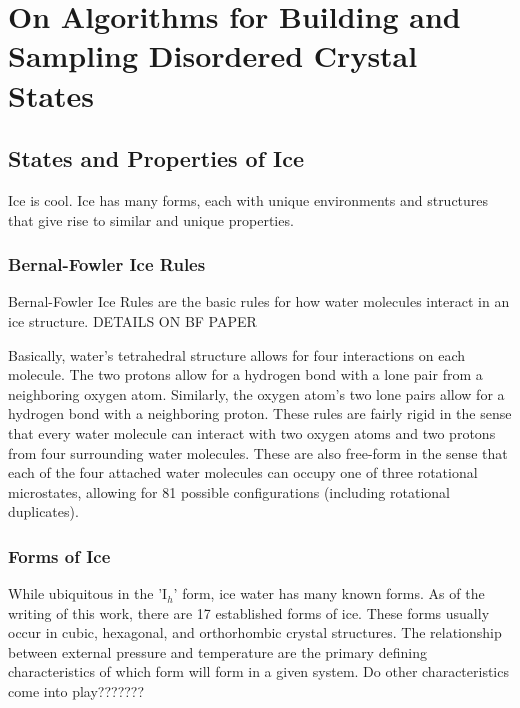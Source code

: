 \chapter{On Algorithms for Building and Sampling Disordered Crystal States}
\label{ch:iceXI}


\section{States and Properties of Ice}

Ice is cool. 
Ice has many forms, each with unique environments and structures that give rise to similar and unique properties. 

\subsection{Bernal-Fowler Ice Rules}

Bernal-Fowler Ice Rules are the basic rules for how water molecules interact in an ice structure.
DETAILS ON BF PAPER

Basically, water's tetrahedral structure allows for four interactions on each molecule. 
The two protons allow for a hydrogen bond with a lone pair from a neighboring oxygen atom.
Similarly, the oxygen atom's two lone pairs allow for a hydrogen bond with a neighboring proton. 
These rules are fairly rigid in the sense that every water molecule can interact with two oxygen atoms and two protons from four surrounding water molecules.
These are also free-form in the sense that each of the four attached water molecules can occupy one of three rotational microstates, allowing for 81 possible configurations (including rotational duplicates).

\subsection{Forms of Ice}

While ubiquitous in the 'I$_{h}$' form, ice water has many known forms.
As of the writing of this work, there are 17 established forms of ice. 
These forms usually occur in cubic, hexagonal, and orthorhombic crystal structures.
The relationship between external pressure and temperature are the primary defining characteristics of which form will form in a given system. 
Do other characteristics come into play??????? %



